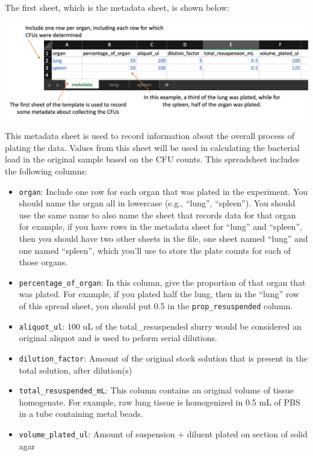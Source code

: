 \documentclass[
]{book}
\providecommand{\tightlist}{%
  \setlength{\itemsep}{0pt}\setlength{\parskip}{0pt}}
\begin{document}
The first sheet, which is the metadata sheet, is shown below:

\includegraphics[width=1\linewidth]{figures/cfu_template_metadata}

This metadata sheet is used to record information about the overall process of
plating the data. Values from this sheet will be used in calculating the bacterial
load in the original sample based on the CFU counts. This spreadsheet includes
the following columns:

\begin{itemize}
\tightlist
\item
  \texttt{organ}: Include one row for each organ that was plated in the experiment.
  You should name the organ all in lowercase (e.g., ``lung'', ``spleen''). You
  should use the same name to also name the sheet that records data for that organ
  for example, if you have rows in the metadata sheet for ``lung'' and ``spleen'',
  then you should have two other sheets in the file, one sheet named ``lung'' and
  one named ``spleen'', which you'll use to store the plate counts for each of those
  organs.
\item
  \texttt{percentage\_of\_organ}: In this column, give the proportion of that organ that
  was plated. For example, if you plated half the lung, then in the ``lung'' row
  of this spread sheet, you should put 0.5 in the \texttt{prop\_resuspended} column.
\item
  \texttt{aliquot\_ul}: 100 uL of the total\_resuspended slurry would be considered an original aliquot and is used to peform serial dilutions.
\item
  \texttt{dilution\_factor}: Amount of the original stock solution that is present in the
  total solution, after dilution(s)
\item
  \texttt{total\_resuspended\_mL}: This column contains an original volume of tissue homogenate. For example, raw lung tissue is homogenized in 0.5 mL of PBS in a tube containing metal beads.
\item
  \texttt{volume\_plated\_ul}: Amount of suspension + diluent plated on section of solid agar
\end{itemize}
\end{document}
